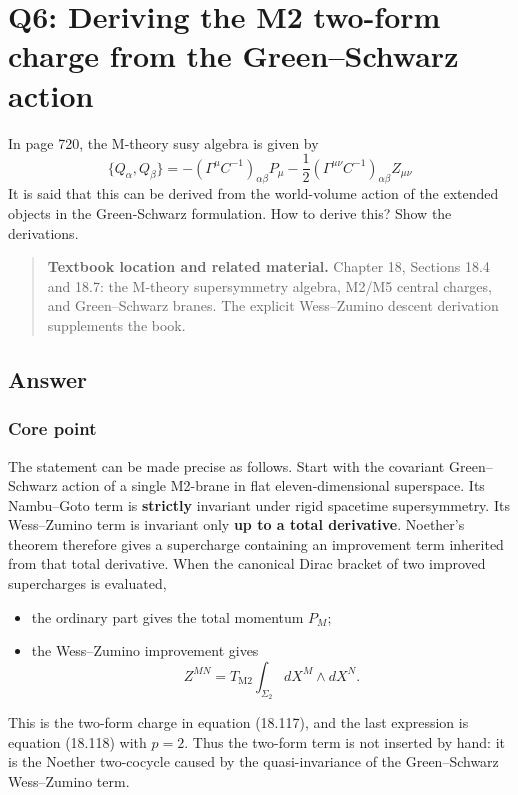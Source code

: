 \documentclass[
  10pt,
  a4paper,
  openany]{book}
\providecommand{\tightlist}{%
  \setlength{\itemsep}{0pt}\setlength{\parskip}{0pt}}
\begin{document}
\section{Q6: Deriving the M2 two-form charge from the Green--Schwarz
action}\label{q6-deriving-the-m2-two-form-charge-from-the-greenschwarz-action}

In page 720, the M-theory susy algebra is given by \[
\{ Q_{\alpha},Q_{\beta} \}=-(\Gamma^\mu C^{-1})_{\alpha\beta}P_{\mu}-\frac{1}{2}(\Gamma^{\mu \nu}C^{-1})_{\alpha\beta}Z_{\mu \nu}
\] It is said that this can be derived from the world-volume action of
the extended objects in the Green-Schwarz formulation. How to derive
this? Show the derivations.

\begin{quote}
\textbf{Textbook location and related material.} Chapter 18, Sections
18.4 and 18.7: the M-theory supersymmetry algebra, M2/M5 central
charges, and Green--Schwarz branes. The explicit Wess--Zumino descent
derivation supplements the book.
\end{quote}

\subsection{Answer}\label{answer-41}

\subsubsection{Core point}\label{core-point-41}

The statement can be made precise as follows. Start with the covariant
Green--Schwarz action of a single M2-brane in flat eleven-dimensional
superspace. Its Nambu--Goto term is \textbf{strictly} invariant under
rigid spacetime supersymmetry. Its Wess--Zumino term is invariant only
\textbf{up to a total derivative}. Noether's theorem therefore gives a
supercharge containing an improvement term inherited from that total
derivative. When the canonical Dirac bracket of two improved
supercharges is evaluated,

\begin{itemize}
\tightlist
\item
  the ordinary part gives the total momentum \(P_M\);
\item
  the Wess--Zumino improvement gives \[
  Z^{MN}=T_{\mathrm{M2}}
  \int_{\Sigma_2}dX^M\wedge dX^N.
  \]
\end{itemize}

This is the two-form charge in equation (18.117), and the last
expression is equation (18.118) with \(p=2\). Thus the two-form term is
not inserted by hand: it is the Noether two-cocycle caused by the
quasi-invariance of the Green--Schwarz Wess--Zumino term.
\end{document}
